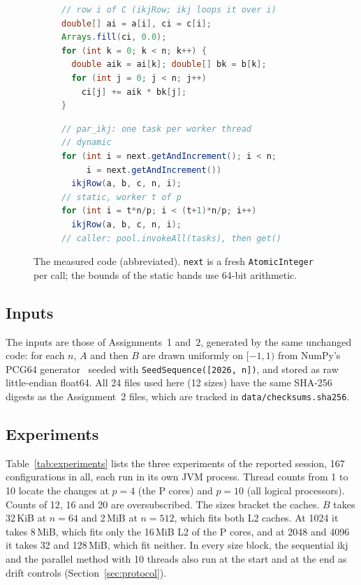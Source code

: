 \documentclass[11pt,a4paper]{article}
\begin{document}
\begin{figure}[tbp]
\centering
\begin{subfigure}[t]{0.48\linewidth}
\begin{lstlisting}[language=Java]
// row i of C (ikjRow; ikj loops it over i)
double[] ai = a[i], ci = c[i];
Arrays.fill(ci, 0.0);
for (int k = 0; k < n; k++) {
  double aik = ai[k]; double[] bk = b[k];
  for (int j = 0; j < n; j++)
    ci[j] += aik * bk[j];
}
\end{lstlisting}
\end{subfigure}\hfill
\begin{subfigure}[t]{0.48\linewidth}
\begin{lstlisting}[language=Java]
// par_ikj: one task per worker thread
// dynamic
for (int i = next.getAndIncrement(); i < n;
     i = next.getAndIncrement())
  ikjRow(a, b, c, n, i);
// static, worker t of p
for (int i = t*n/p; i < (t+1)*n/p; i++)
  ikjRow(a, b, c, n, i);
// caller: pool.invokeAll(tasks), then get()
\end{lstlisting}
\end{subfigure}
\caption{The measured code (abbreviated). \texttt{next} is a fresh
\texttt{AtomicInteger} per call; the bounds of the static bands use 64-bit
arithmetic.}
\label{fig:kernels}
\end{figure}

\subsection{Inputs}

The inputs are those of Assignments~1 and~2, generated by the same unchanged
code: for each $n$, $A$ and then $B$ are drawn uniformly on $[-1,1)$ from
NumPy's PCG64 generator~\cite{harris2020} seeded with
\texttt{SeedSequence([2026, n])}, and stored as raw little-endian float64. All 24
files used here (12 sizes) have the same SHA-256 digests as the Assignment~2
files, which are tracked in \texttt{data/checksums.sha256}.

\subsection{Experiments}

Table~\ref{tab:experiments} lists the three experiments of the reported
session, 167 configurations in all, each run in its own JVM process. Thread
counts from 1 to 10 locate the changes at $p=4$ (the P cores) and $p=10$ (all
logical processors). Counts of 12, 16 and 20 are oversubscribed. The sizes
bracket the caches. $B$ takes 32\,KiB at $n=64$ and 2\,MiB at $n=512$, which
fits both L2 caches. At 1024 it takes 8\,MiB, which fits only the 16\,MiB L2
of the P cores, and at 2048 and 4096 it takes 32 and 128\,MiB, which fit
neither. In every size block, the sequential ikj and the parallel method with
10 threads also run at the start and at the end as drift controls
(Section~\ref{sec:protocol}).
\end{document}
